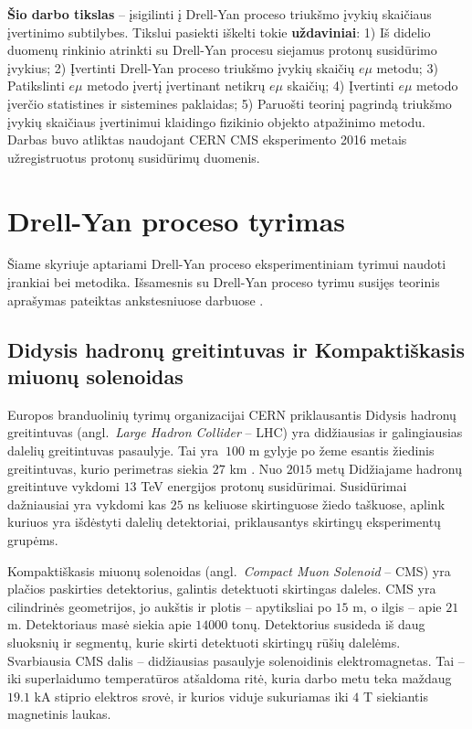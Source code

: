 \documentclass[a4paper, 12pt, oneside]{article}
\newcommand{\emu}{e\mu}
\begin{document}
\textbf{Šio darbo tikslas} -- įsigilinti į Drell-Yan proceso triukšmo įvykių skaičiaus įvertinimo subtilybes.
Tikslui pasiekti iškelti tokie \textbf{uždaviniai}:
1) Iš didelio duomenų rinkinio atrinkti su Drell-Yan procesu siejamus protonų susidūrimo įvykius;
2) Įvertinti Drell-Yan proceso triukšmo įvykių skaičių $\emu$ metodu;
3) Patikslinti $\emu$ metodo įvertį įvertinant netikrų $\emu$ skaičių;
4) Įvertinti $\emu$ metodo įverčio statistines ir sistemines paklaidas;
5) Paruošti teorinį pagrindą triukšmo įvykių skaičiaus įvertinimui klaidingo fizikinio objekto atpažinimo metodu.
Darbas buvo atliktas naudojant CERN CMS eksperimento 2016 metais užregistruotus protonų susidūrimų duomenis.

\section{Drell-Yan proceso tyrimas}

Šiame skyriuje aptariami Drell-Yan proceso eksperimentiniam tyrimui naudoti įrankiai bei metodika.
Išsamesnis su Drell-Yan proceso tyrimu susijęs teorinis aprašymas pateiktas ankstesniuose darbuose \cite{MAbak, MAk1}.

\subsection{Didysis hadronų greitintuvas ir Kompaktiškasis miuonų solenoidas}

Europos branduolinių tyrimų organizacijai CERN priklausantis Didysis hadronų greitintuvas
(angl.\ \textit{Large Hadron Collider} -- LHC) yra didžiausias ir galingiausias dalelių greitintuvas pasaulyje.
Tai yra $~100$ m gylyje po žeme esantis žiedinis greitintuvas, kurio perimetras siekia $27$ km \cite{LHC}.
Nuo $2015$ metų Didžiajame hadronų greitintuve vykdomi $13$ TeV energijos protonų susidūrimai.
Susidūrimai dažniausiai yra vykdomi kas $25$ ns keliuose skirtinguose žiedo taškuose, aplink kuriuos yra išdėstyti dalelių
detektoriai, priklausantys skirtingų eksperimentų grupėms.

Kompaktiškasis miuonų solenoidas (angl.\ \textit{Compact Muon Solenoid} -- CMS) yra plačios paskirties
detektorius, galintis detektuoti skirtingas daleles.
CMS yra cilindrinės geometrijos, jo aukštis ir plotis -- apytiksliai po $15$ m, o ilgis --
apie $21$ m.
Detektoriaus masė siekia apie $14000$ tonų.
Detektorius susideda iš daug sluoksnių ir segmentų, kurie skirti detektuoti skirtingų rūšių dalelėms.
Svarbiausia CMS dalis -- didžiausias pasaulyje solenoidinis elektromagnetas.
Tai -- iki superlaidumo temperatūros atšaldoma ritė, kuria darbo metu teka maždaug $19.1$ kA stiprio
elektros srovė, ir kurios viduje sukuriamas iki $4$ T siekiantis magnetinis laukas.
\end{document}
